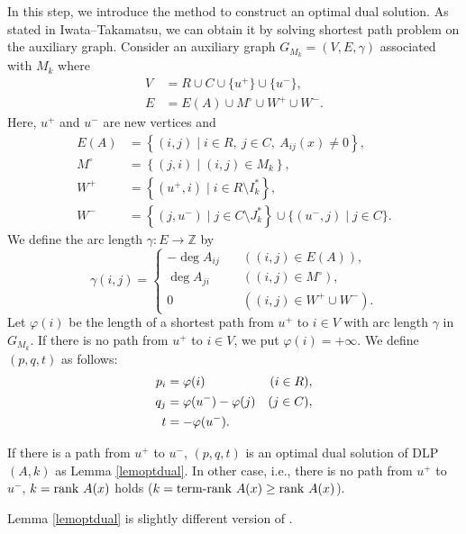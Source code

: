 In this step, we introduce the method to construct an optimal dual solution.
As stated in Iwata--Takamatsu\cite{MP}, 
we can obtain it by solving shortest path problem on the auxiliary graph. 
Consider an auxiliary graph $ G_{M_k} = (V,E,\gamma) $ associated with $ M_k $ where 
\begin{align*}
V &= R \cup C \cup \{ u^+ \} \cup \{ u^- \},\\
E &= E(A) \cup M^{\circ} \cup W^{+} \cup W^{-}.
\end{align*}
Here, $ u^{+} $ and $ u^{-} $ are new vertices and 
\begin{align*}
E(A) &= \left\{ (i,j) \mid i \in R , \ j \in C , \ A_{ij} (x) \neq 0 \right\},\\
M^{\circ} &= \left\{ (j,i) \mid (i,j) \in M_k \right\},\\
W^{+} &= \left\{ ( u^{+} , i) \mid i \in R \setminus I^{\ast}_k \right\},\\
W^{-} &= \left\{ (j,u^{-}) \mid j \in C \setminus J^{\ast}_k  \right\} \cup \{ (u^-,j) \mid j \in C \}.
\end{align*}
We define the arc length $ \gamma : E \to \mathbb{Z} $ by
\[ \gamma (i,j) = \begin{cases} - \deg A_{ij} \quad & \left( (i,j) \in E(A) \right),\\
                              \deg A_{ji}   \quad & \left( (i,j) \in M^{\circ} \right),\\
                              0                   & \left( (i,j) \in W^{+} \cup W^{-} \right). \end{cases} \]
Let $ \varphi (i) $ be the length of a shortest path from $ u^+ $ to $ i \in V $ 
with arc length $ \gamma $ in $ G_{M_k} $. 
If there is no path from $ u^+ $ to $ i \in V $, we put $ \varphi (i) = + \infty $.
We define $ (p,q,t) $ as follows:
\begin{align}
p_i &= \varphi (i) & ( i \in R ), \notag \\
q_j &= \varphi(u^-) - \varphi (j) & ( j \in C ), \label{eqdefpq}\\
t   &= - \varphi(u^-). \notag
\end{align}

If there is a path from $ u^+ $ to $ u^- $, $ (p,q,t) $ is an optimal dual solution of DLP$ (A,k) $ 
as Lemma \ref{lemoptdual}. 
In other case, i.e., there is no path from $ u^+ $ to $ u^- $, 
$ k = \mathrm{rank} \  A(x) $ holds ($ k = \mathrm{term}\mbox{-}\mathrm{rank} \  A (x) \ge \mathrm{rank} \  A(x) $).

Lemma \ref{lemoptdual} is slightly different version of \cite[Lemma 3]{MP}.

